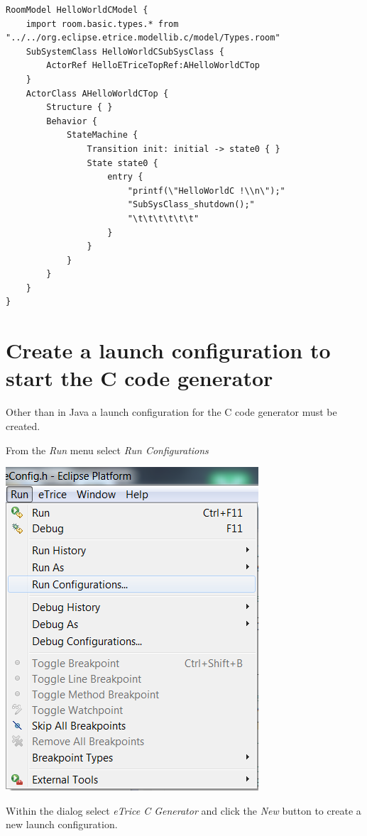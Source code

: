 \begin{verbatim} 
RoomModel HelloWorldCModel {
	import room.basic.types.* from "../../org.eclipse.etrice.modellib.c/model/Types.room"
	SubSystemClass HelloWorldCSubSysClass {
		ActorRef HelloETriceTopRef:AHelloWorldCTop 
	}
	ActorClass AHelloWorldCTop {
		Structure { }
		Behavior {
			StateMachine {
				Transition init: initial -> state0 { }
				State state0 {
					entry {
						"printf(\"HelloWorldC !\\n\");"
						"SubSysClass_shutdown();"
						"\t\t\t\t\t\t"
					}
				}
			}
		}
	}	
}
\end{verbatim}

\section{Create a launch configuration to start the C code generator}

Other than in Java a launch configuration for the C code generator must be created.

From the \textit{Run} menu select \textit{Run Configurations}

\includegraphics{images/034-HelloWorldC06.png}

Within the dialog select \textit{eTrice C Generator} and click the \textit{New} button to create a new launch configuration.


